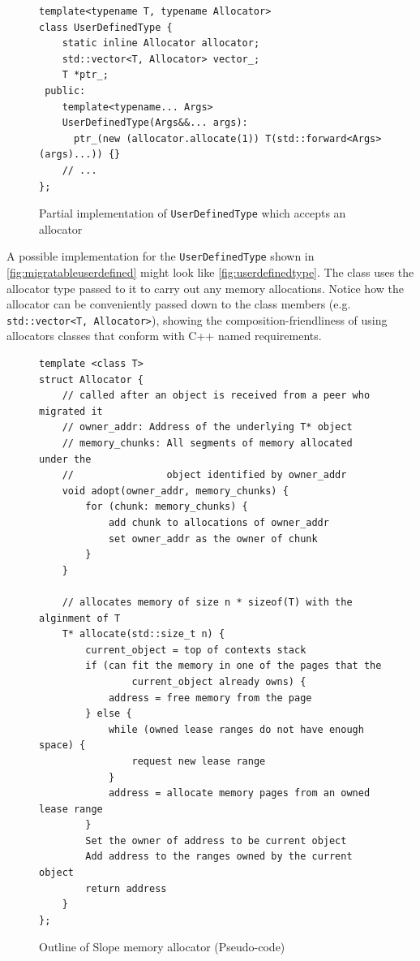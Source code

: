 \begin{figure}[t]
\begin{lstlisting}
template<typename T, typename Allocator>
class UserDefinedType {
    static inline Allocator allocator;
    std::vector<T, Allocator> vector_;
    T *ptr_;
 public:
    template<typename... Args>
    UserDefinedType(Args&&... args):
      ptr_(new (allocator.allocate(1)) T(std::forward<Args>(args)...)) {}
    // ...
};
\end{lstlisting}
\caption{ Partial implementation of \texttt{UserDefinedType} which accepts an allocator}
\label{fig:userdefinedtype}
\end{figure}


A possible implementation for the \texttt{UserDefinedType} shown in
\autoref{fig:migratableuserdefined} might look like \autoref{fig:userdefinedtype}.
The class uses the allocator type passed to it to carry out any memory
allocations. Notice how the allocator can be conveniently passed down to the
class members (e.g. \texttt{std::vector<T, Allocator>}), showing the
composition-friendliness of using allocators classes that conform with C++ named
requirements.


\begin{figure}[tp]
\begin{lstlisting}
template <class T>
struct Allocator {
    // called after an object is received from a peer who migrated it
    // owner_addr: Address of the underlying T* object
    // memory_chunks: All segments of memory allocated under the
    //                object identified by owner_addr
    void adopt(owner_addr, memory_chunks) {
        for (chunk: memory_chunks) {
            add chunk to allocations of owner_addr
            set owner_addr as the owner of chunk
        }
    }

    // allocates memory of size n * sizeof(T) with the alginment of T
    T* allocate(std::size_t n) {
        current_object = top of contexts stack
        if (can fit the memory in one of the pages that the
                current_object already owns) {
            address = free memory from the page
        } else {
            while (owned lease ranges do not have enough space) {
                request new lease range
            }
            address = allocate memory pages from an owned lease range
        }
        Set the owner of address to be current object
        Add address to the ranges owned by the current object
        return address
    }
};
\end{lstlisting}
    \caption{ Outline of Slope memory allocator (Pseudo-code) }
\label{fig:allocimpl}
\end{figure}


